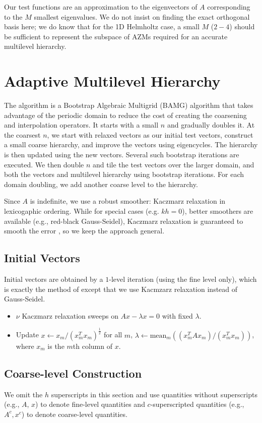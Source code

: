\documentclass{article}
\begin{document}
Our test functions are an approximation to the eigenvectors of $A$ corresponding to the $M$ smallest eigenvalues. We do not insist on finding the exact orthogonal basis here; we do know that for the 1D Helmholtz case, a small $M$ ($2-4$) should be sufficient to represent the subspace of AZMs required for an accurate multilevel hierarchy.

\section{Adaptive Multilevel Hierarchy}
The algorithm is a Bootstrap Algebraic Multigrid (BAMG) algorithm that takes advantage of the periodic domain to reduce the cost of creating the coarsening and interpolation operators. It starts with a small $n$ and gradually doubles it. At the coarsest $n$, we start with relaxed vectors as our initial test vectors, construct a small coarse hierarchy, and improve the vectors using eigencycles. The hierarchy is then updated using the new vectors. Several such bootstrap iterations are executed. We then double $n$ and tile the test vectors over the larger domain, and both the vectors and multilevel hierarchy using bootstrap iterations. For each domain doubling, we add another coarse level to the hierarchy.

Since $A$ is indefinite, we use a robust smoother: Kaczmarz relaxation in lexicogaphic ordering. While for special cases (e.g. $k h = 0$), better smoothers are available (e.g., red-black Gauss-Seidel), Kaczmarz relaxation is guaranteed to smooth the error \cite{amg_theory}, so we keep the approach general.

\subsection{Initial Vectors}
Initial vectors are obtained by a $1$-level iteration (using the fine level only), which is exactly the method of \cite{mg_eigen} except that we use Kacmzarz relaxation instead of Gauss-Seidel.
\begin{itemize}
	\item $\nu$ Kaczmarz relaxation sweeps on $A x - \lambda x = 0$ with fixed $\lambda$.
	\item Update $x \longleftarrow x_m / (x_m^T x_m)^{\frac12}$ for all $m$, $\lambda \longleftarrow \text{mean}_m ((x_m^T A x_m)/(x_m^T x_m))$, where $x_m$ is the $m$th column of $x$.
\end{itemize}

\subsection{Coarse-level Construction}
We omit the $h$ superscripts in this section and use quantities without superscripts (e.g., $A$, $x$) to denote fine-level quantities and $c$-superscripted quantities (e.g., $A^c, x^c$) to denote coarse-level quantities.
\end{document}
